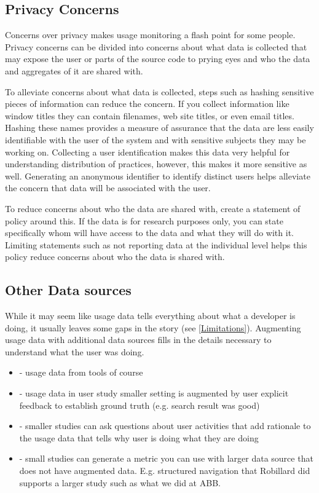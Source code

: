\subsection{Privacy Concerns}

Concerns over privacy makes usage monitoring a flash point for some people.  Privacy concerns can be divided into concerns about what data is collected that may expose the user or parts of the source code to prying eyes and who the data and aggregates of it are shared with.

To alleviate concerns about what data is collected, steps such as hashing sensitive pieces of information can reduce the concern. If you collect information like window titles they can contain filenames, web site titles, or even email titles.  Hashing these names provides a measure of assurance that the data are less easily identifiable with the user of the system and with sensitive subjects they may be working on.   Collecting a user identification makes this data very helpful for understanding distribution of practices, however, this makes it more sensitive as well.  Generating an anonymous identifier to identify distinct users helps alleviate the concern that data will be associated with the user.

To reduce concerns about who the data are shared with, create a statement of policy around this.  If the data is for research purposes only, you can state specifically whom will have access to the data and what they will do with it.  Limiting statements such as not reporting data at the individual level helps this policy reduce concerns about who the data is shared with.


\subsection{Other Data sources}

While it may seem like usage data tells everything about what a developer is doing, it usually leaves some gaps in the story (see \ref{Limitations}).  Augmenting usage data with additional data sources fills in the details necessary to understand what the user was doing.  
    \begin{itemize}
    \item
	- usage data from tools of course
\item
	- usage data in user study smaller setting is augmented by user explicit feedback to establish ground truth (e.g. search result was good)
\item
	- smaller studies can ask questions about user activities that add rationale to the usage data that tells why user is doing what they are doing
\item
	- small studies can generate a metric you can use with larger data source that does not have augmented data.  E.g. structured navigation that Robillard did supports a larger study such as what we did at ABB.
    \end{itemize}
    
